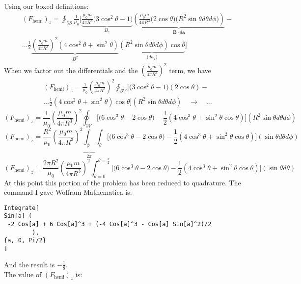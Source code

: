 \documentclass[a4paper,12pt]{article} %
\begin{document}
Using our boxed definitions:
$$
\begin{align}
	(F_{\text{hemi}})_z=\oint_{\partial S}\frac{1}{\mu_0}\Bigg[\underbrace{\frac{\mu_0m}{4\pi R^3}\big(3\cos^2\theta -1\big)}_{B_z}\underbrace{\left(\frac{\mu_0m}{4\pi R^3}
\big(2\cos\theta\big)\big(R^2\sin\theta d\theta d\phi\big)\right)}_{\mathbf{B}\cdot d\mathbf{a}}- \\\ldots \frac12 \underbrace{\left(\frac{\mu_0m}{4\pi R^3}\right)^2\left(4\cos^2\theta + \sin^2\theta\right)}_{B^2} \underbrace{(R^2\sin\theta d\theta d\phi)\cos\theta}_{\big(d a_z\big)}
\Bigg]
\end{align}
$$
When we factor out the differentials and the $\left(\frac{\mu_0m}{4\pi R^3}\right)^2$ term, we have
$$
\begin{align}
	(F_{\text{hemi}})_z=\frac{1}{\mu_0}\left(\frac{\mu_0m}{4\pi R^3}\right)^2\oint_{\partial V}\Bigg[\big(3\cos^2\theta -1\big)\left(2\cos\theta\right)- \\\ldots \frac12 \left(4\cos^2\theta + \sin^2\theta\right)\cos\theta
\Bigg](R^2\sin\theta d\theta d\phi) \quad\rightarrow\quad\ldots
\end{align}
$$
$$ 
(F_{\text{hemi}})_z=\frac{1}{\mu_0}\left(\frac{\mu_0m}{4\pi R^3}\right)^2\oint_{\partial V}\Bigg[\big(6\cos^3\theta -2\cos\theta\big)- \frac12 \left(4\cos^3\theta + \sin^2\theta\cos{\theta}\right)\Bigg](R^2\sin\theta d\theta d\phi)
$$
$$ 
(F_{\text{hemi}})_z=\frac{R^2}{\mu_0}\left(\frac{\mu_0m}{4\pi R^3}\right)^2\underbrace{\int_{\phi}}_{2\pi}\int_{\theta}\Bigg[\big(6\cos^3\theta -2\cos\theta\big)- \frac12 \left(4\cos^3\theta + \sin^2\theta\cos{\theta}\right)\Bigg](\sin\theta d\theta d\phi)
$$
$$ 
(F_{\text{hemi}})_z=\frac{2\pi R^2}{\mu_0}\left(\frac{\mu_0m}{4\pi R^3}\right)^2\int_{\theta=0}^{\theta=\frac{\pi}{2}}\Bigg[\big(6\cos^3\theta -2\cos\theta\big)- \frac12 \left(4\cos^3\theta + \sin^2\theta\cos{\theta}\right)\Bigg](\sin\theta d\theta)
$$
At this point this portion of the problem has been reduced to quadrature. The command I gave Wolfram Mathematica is:
\begin{verbatim}
Integrate[
Sin[a] (
 -2 Cos[a] + 6 Cos[a]^3 + (-4 Cos[a]^3 - Cos[a] Sin[a]^2)/2
        ),
{a, 0, Pi/2}
]
\end{verbatim}
And the result is $-\frac{1}{8}$.\\

The value of $\left(F_{\text{hemi}}\right)_z$ is:
\end{document}
